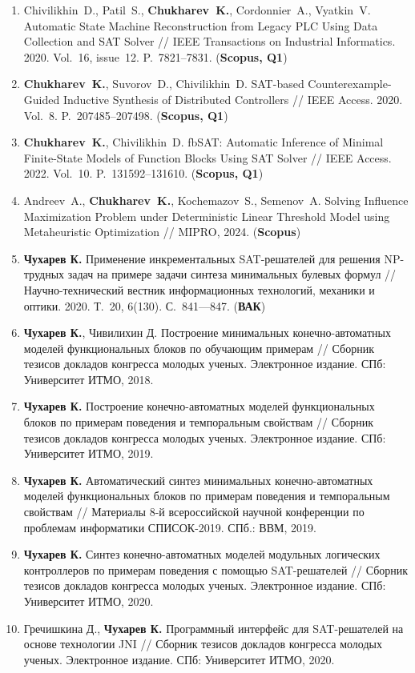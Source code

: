 \begin{enumerate}[left=0pt]
    \item Chivilikhin~D., Patil~S., \textbf{Chukharev~K.}, Cordonnier~A., Vyatkin~V. Automatic State Machine Reconstruction from Legacy PLC Using Data Collection and SAT Solver // IEEE Transactions on Industrial Informatics. 2020. Vol.~16, issue~12. P.~7821–7831. (\textbf{Scopus, Q1})
    \item \textbf{Chukharev~K.}, Suvorov~D., Chivilikhin~D. SAT-based Counterexample-Guided Inductive Synthesis of Distributed Controllers // IEEE Access. 2020. Vol.~8. P.~207485–207498. (\textbf{Scopus, Q1})
    \item \textbf{Chukharev~K.}, Chivilikhin~D. fbSAT: Automatic Inference of Minimal Finite-State Models of Function Blocks Using SAT Solver // IEEE Access. 2022. Vol.~10. P.~131592–131610. (\textbf{Scopus, Q1})
    \item Andreev~A., \textbf{Chukharev~K.}, Kochemazov~S., Semenov~A. Solving Influence Maximization Problem under Deterministic Linear Threshold Model using Metaheuristic Optimization // MIPRO, 2024. (\textbf{Scopus})
    \item \textbf{Чухарев К.} Применение инкрементальных SAT-решателей для решения NP-трудных задач на примере задачи синтеза минимальных булевых формул // Научно-технический вестник информационных технологий, механики и оптики. 2020. Т.~20, 6(130). С.~841—847. (\textbf{ВАК})
    \item \textbf{Чухарев К.}, Чивилихин Д. Построение минимальных конечно-автоматных моделей функциональных блоков по обучающим примерам // Сборник тезисов докладов конгресса молодых ученых. Электронное издание. СПб: Университет ИТМО, 2018.
    \item \textbf{Чухарев К.} Построение конечно-автоматных моделей функциональных блоков по примерам поведения и темпоральным свойствам // Сборник тезисов докладов конгресса молодых ученых. Электронное издание. СПб: Университет ИТМО, 2019.
    \item \textbf{Чухарев К.} Автоматический синтез минимальных конечно-автоматных моделей функциональных блоков по примерам поведения и темпоральным свойствам // Материалы 8-й всероссийской научной конференции по проблемам информатики СПИСОК-2019. СПб.: ВВМ, 2019.
    \item \textbf{Чухарев К.} Синтез конечно-автоматных моделей модульных логических контроллеров по примерам поведения с помощью SAT-решателей // Сборник тезисов докладов конгресса молодых ученых. Электронное издание. СПб: Университет ИТМО, 2020.
    \item Гречишкина Д., \textbf{Чухарев К.} Программный интерфейс для SAT-решателей на основе технологии JNI // Сборник тезисов докладов конгресса молодых ученых. Электронное издание. СПб: Университет ИТМО, 2020.
\end{enumerate}


